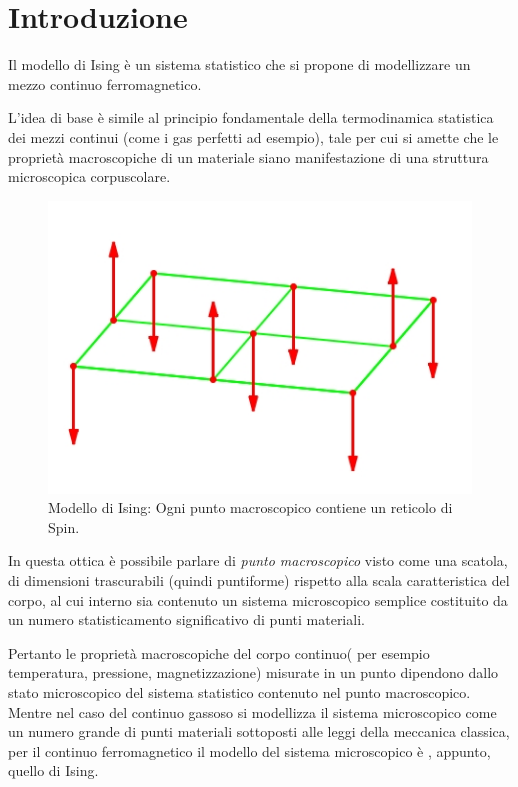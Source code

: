 \section{Introduzione}\label{Introduzione}
Il modello di Ising è un sistema statistico che si propone di modellizzare un mezzo continuo ferromagnetico.

L'idea di base è simile al principio fondamentale della termodinamica statistica dei mezzi continui (come i gas perfetti ad esempio), tale per cui si amette che le proprietà macroscopiche di un materiale siano manifestazione di una struttura microscopica corpuscolare.

\begin{figure}
\vspace{-30pt}
  \begin{center}
      \includegraphics[scale=0.45]{Immagini/Isingmodel.jpg}
  \end{center}
\vspace{-20pt}
  \caption{Modello di Ising: Ogni punto macroscopico contiene un reticolo di Spin.}\label{fig:1}
\vspace{-10pt}
\end{figure}
In questa ottica è possibile parlare di \emph{punto macroscopico} visto come una scatola, di dimensioni trascurabili (quindi puntiforme) rispetto alla scala caratteristica del corpo, al cui interno sia contenuto un sistema microscopico semplice costituito da un numero statisticamento significativo di punti materiali.

Pertanto le proprietà macroscopiche del corpo continuo( per esempio temperatura, pressione, magnetizzazione) misurate in un punto dipendono dallo stato microscopico del sistema statistico contenuto nel punto macroscopico.
Mentre nel caso del continuo gassoso si modellizza il sistema microscopico come un numero grande di punti materiali sottoposti alle leggi della meccanica classica, per il continuo ferromagnetico il modello del sistema microscopico è , appunto, quello di Ising.

